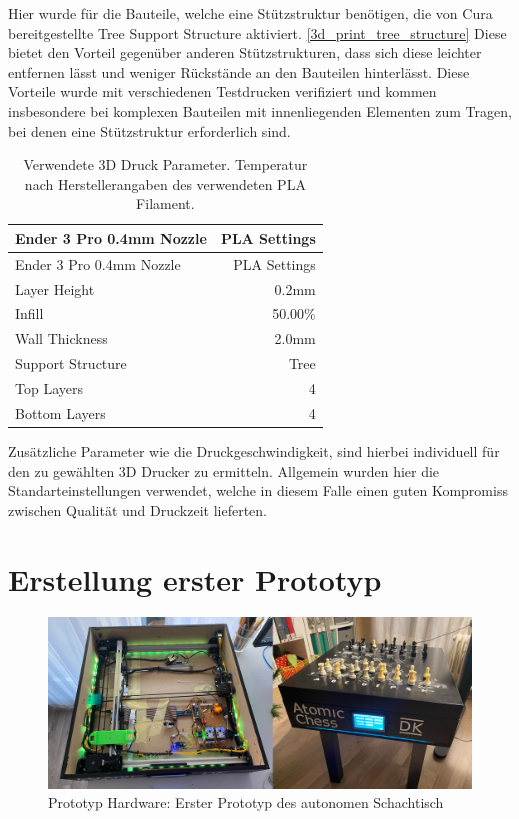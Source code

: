 Hier wurde für die Bauteile, welche eine Stützstruktur benötigen, die
von Cura bereitgestellte Tree Support Structure aktiviert.
\ref{3d_print_tree_structure} Diese bietet den Vorteil gegenüber anderen
Stützstrukturen, dass sich diese leichter entfernen lässt und weniger
Rückstände an den Bauteilen hinterlässt. Diese Vorteile wurde mit
verschiedenen Testdrucken verifiziert und kommen insbesondere bei
komplexen Bauteilen mit innenliegenden Elementen zum Tragen, bei denen
eine Stützstruktur erforderlich sind.

\begin{longtable}[]{@{}lr@{}}
\caption{Verwendete 3D Druck Parameter. Temperatur nach
Herstellerangaben des verwendeten PLA Filament.
\label{3dprintsettings}}\tabularnewline
\toprule
Ender 3 Pro 0.4mm Nozzle & PLA Settings\tabularnewline
\midrule
\endfirsthead
\toprule
Ender 3 Pro 0.4mm Nozzle & PLA Settings\tabularnewline
\midrule
\endhead
Layer Height & 0.2mm\tabularnewline
Infill & 50.00\%\tabularnewline
Wall Thickness & 2.0mm\tabularnewline
Support Structure & Tree\tabularnewline
Top Layers & 4\tabularnewline
Bottom Layers & 4\tabularnewline
\bottomrule
\end{longtable}

Zusätzliche Parameter wie die Druckgeschwindigkeit, sind hierbei
individuell für den zu gewählten 3D Drucker zu ermitteln. Allgemein
wurden hier die Standarteinstellungen verwendet, welche in diesem Falle
einen guten Kompromiss zwischen Qualität und Druckzeit lieferten.

\hypertarget{erstellung-erster-prototyp}{%
\chapter{Erstellung erster Prototyp}\label{erstellung-erster-prototyp}}

\begin{figure}
\centering
\includegraphics{images/table_images/dk.png}
\caption{Prototyp Hardware: Erster Prototyp des autonomen Schachtisch
\label{dk}}
\end{figure}

